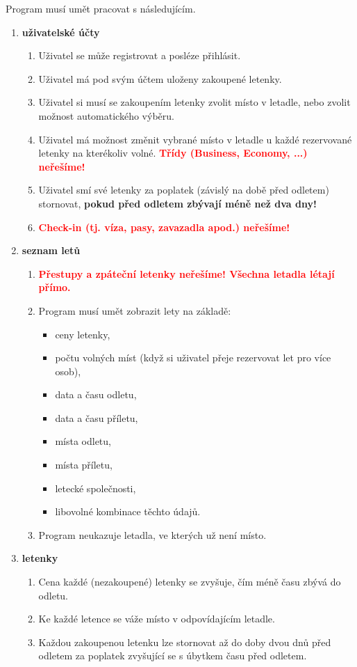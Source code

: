 \documentclass[a4paper,11pt]{article}
\begin{document}
Program musí umět pracovat s následujícím.
\begin{enumerate}[topsep=0pt]
 \item \textbf{uživatelské účty}
 \begin{enumerate}[topsep=0pt]
  \item Uživatel se může registrovat a posléze přihlásit.
  \item Uživatel má pod svým účtem uloženy zakoupené letenky.
  \item Uživatel si musí se zakoupením letenky zvolit místo v letadle, nebo
   zvolit mož\-nost automatického výběru.
  \item Uživatel má možnost změnit vybrané místo v letadle u každé rezervované
   letenky na kterékoliv volné. \textcolor{red}{\textbf{Třídy (Business,
   Economy, ...) neřešíme!}}
  \item Uživatel smí své letenky za poplatek (závislý na době před
   odletem) stornovat, \textbf{pokud před odletem zbývají méně než dva dny!}
  \item \textbf{\textcolor{red}{Check-in (tj. víza, pasy, zavazadla apod.)
   neřešíme!}}
 \end{enumerate}
 \item \textbf{seznam letů}
 \begin{enumerate}[topsep=0pt]
  \item \textcolor{red}{\textbf{Přestupy a zpáteční letenky neřešíme! Všechna
   letadla létají přímo.}}
  \item Program musí umět zobrazit lety na základě:
  \begin{itemize}[topsep=0pt]
   \item ceny letenky,
   \item počtu volných míst (když si uživatel přeje rezervovat let pro více
    osob),
   \item data a času odletu,
   \item data a času příletu,
   \item místa odletu,
   \item místa příletu,
   \item letecké společnosti,
   \item libovolné kombinace těchto údajů.
  \end{itemize}
  \item Program neukazuje letadla, ve kterých už není místo.
 \end{enumerate}
 \item \textbf{letenky}
 \begin{enumerate}[topsep=0pt]
  \item Cena každé (nezakoupené) letenky se zvyšuje, čím méně času zbývá do
   odletu.
  \item Ke každé letence se váže místo v odpovídajícím letadle.
  \item Každou zakoupenou letenku lze stornovat až do doby dvou dnů před odletem
   za po\-platek zvyšující se s úbytkem času před odletem.
 \end{enumerate}
\end{enumerate}
\end{document}
